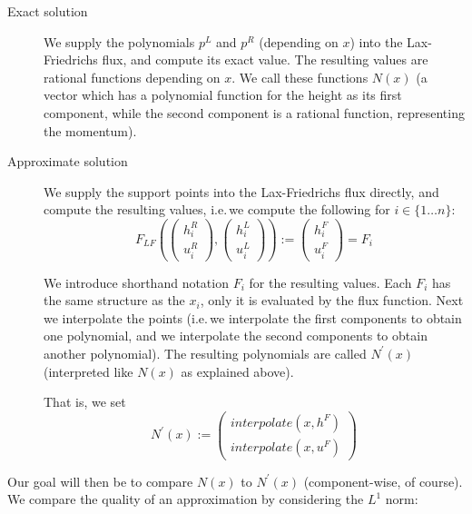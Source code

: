 \documentclass{article}
\begin{document}
\begin{description}
\item[Exact solution] We supply the polynomials $p^L$ and $p^R$ (depending on $x$) into the Lax-Friedrichs flux, and compute its exact value. The resulting values are rational functions depending on $x$. We call these functions $N\left(x\right)$ (a vector which has a polynomial function for the height as its first component, while the second component is a rational function, representing the momentum).

\item[Approximate solution] We supply the support points into the Lax-Friedrichs flux directly, and compute the resulting values, i.e.\,we compute the following for $i \in \{1 \dots n\}$:
  \begin{equation*}
    F_{LF}\left(
      \begin{pmatrix}
        h_i^R \\ u_i^R
      \end{pmatrix},
      \begin{pmatrix}
        h_i^L \\ u_i^L
      \end{pmatrix}
    \right) :=
    \begin{pmatrix}
      h_i^F \\ u_i^F
    \end{pmatrix} = F_i
  \end{equation*}

  We introduce shorthand notation $F_i$ for the resulting values. Each $F_i$ has the same structure as the $x_i$, only it is evaluated by the flux function. Next we interpolate the points (i.e.\,we interpolate the first components to obtain one polynomial, and we interpolate the second components to obtain another polynomial). The resulting polynomials are called $N^\prime\left(x\right)$ (interpreted like $N\left(x\right)$ as explained above).

  That is, we set
  \begin{equation*}
    N^\prime\left(x\right) :=
    \begin{pmatrix}
      interpolate\left(x,h^F\right) \\ interpolate\left(x,u^F\right)
    \end{pmatrix}
  \end{equation*}

\end{description}

Our goal will then be to compare $N\left(x\right)$ to $N^\prime\left(x\right)$ (component-wise, of course). We compare the quality of an approximation by considering the $L^1$ norm:
\end{document}
